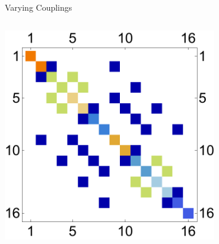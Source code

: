 \documentclass{beamer}
\begin{document}
\begin{frame}[t]{Varying Couplings}
\begin{columns}[T]
\begin{column}{0.5\textwidth}
   			\includegraphics[trim=0mm 0 0 0mm, width=0.7\textwidth]{Images/adj_vary}
		\end{column}
	\end{columns}
	
\end{frame}
\end{document}

